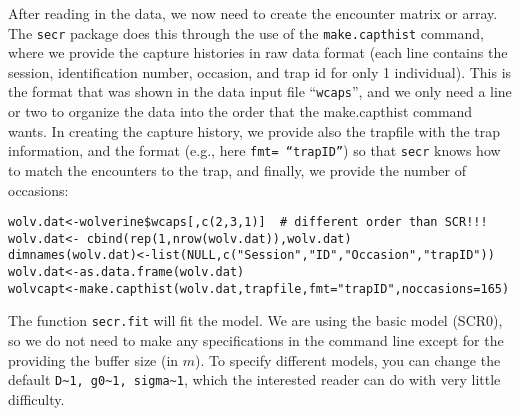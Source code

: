 After reading in the data, we now need to create the encounter matrix
or array.  The \mbox{\tt secr} package does this through the use of the
\mbox{\tt make.capthist} command, where we provide the capture histories in raw
data format (each line contains the session, identification number,
occasion, and trap id for only 1 individual).  This is the format that
was shown in the data input file ``\mbox{\tt wcaps}'', and we only need a line or
two to organize the data into the order that the make.capthist command
wants.  In creating the capture history, we provide also the trapfile
with the trap information, and the format (e.g., here \mbox{\tt fmt= ``trapID''})
so that \mbox{\tt secr} knows how to match the encounters to the trap, and
finally, we provide the number of occasions:
{\small 
\begin{verbatim}
wolv.dat<-wolverine$wcaps[,c(2,3,1)]  # different order than SCR!!!
wolv.dat<- cbind(rep(1,nrow(wolv.dat)),wolv.dat)
dimnames(wolv.dat)<-list(NULL,c("Session","ID","Occasion","trapID"))
wolv.dat<-as.data.frame(wolv.dat)
wolvcapt<-make.capthist(wolv.dat,trapfile,fmt="trapID",noccasions=165)
\end{verbatim}
}
The function  \mbox{\tt secr.fit} will fit the model. We are using the
basic model (SCR0), so we do not need to make any specifications in
the command line except for the providing the buffer size (in $m$).  To
specify different models, you can change the default
\verb#D~1, g0~1, sigma~1#, which the interested reader can do with
very little difficulty.

